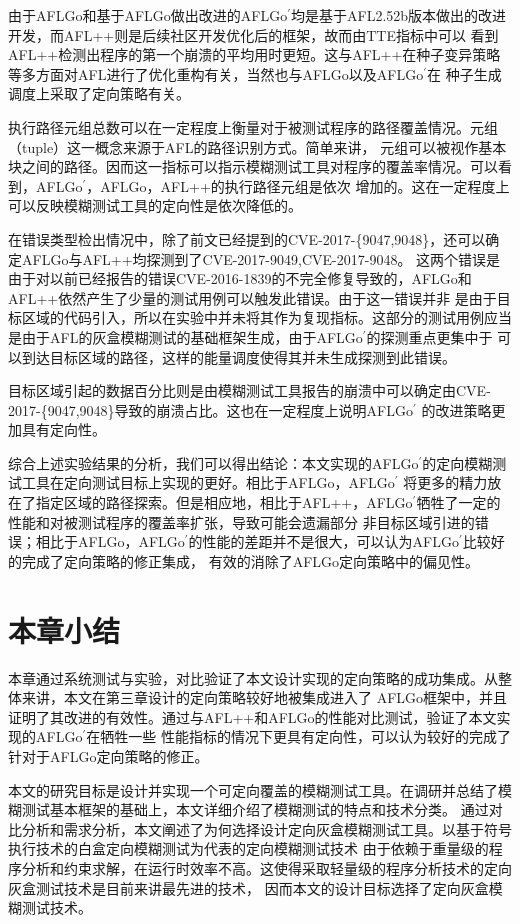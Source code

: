 \documentclass[bachelor]{njupthesis}
\begin{document}
由于AFLGo和基于AFLGo做出改进的AFLGo$^\prime$均是基于AFL2.52b版本做出的改进开发，而AFL++则是后续社区开发优化后的框架，故而由TTE指标中可以
看到AFL++检测出程序的第一个崩溃的平均用时更短。这与AFL++在种子变异策略等多方面对AFL进行了优化重构有关，当然也与AFLGo以及AFLGo$^\prime$在
种子生成调度上采取了定向策略有关。

执行路径元组总数可以在一定程度上衡量对于被测试程序的路径覆盖情况。元组（tuple）这一概念来源于AFL的路径识别方式。简单来讲，
元组可以被视作基本块之间的路径。因而这一指标可以指示模糊测试工具对程序的覆盖率情况。可以看到，AFLGo$^\prime$，AFLGo，AFL++的执行路径元组是依次
增加的。这在一定程度上可以反映模糊测试工具的定向性是依次降低的。

在错误类型检出情况中，除了前文已经提到的CVE-2017-\{9047,9048\}，还可以确定AFLGo与AFL++均探测到了CVE-2017-9049\cite{49CVE},CVE-2017-9048\cite{50CVE}。
这两个错误是由于对以前已经报告的错误CVE-2016-1839\cite{39CVE}的不完全修复导致的，AFLGo和AFL++依然产生了少量的测试用例可以触发此错误。由于这一错误并非
是由于目标区域的代码引入，所以在实验中并未将其作为复现指标。这部分的测试用例应当是由于AFL的灰盒模糊测试的基础框架生成，由于AFLGo$^\prime$的探测重点更集中于
可以到达目标区域的路径，这样的能量调度使得其并未生成探测到此错误。

目标区域引起的数据百分比则是由模糊测试工具报告的崩溃中可以确定由CVE-2017-\{9047,9048\}导致的崩溃占比。这也在一定程度上说明AFLGo$^\prime$
的改进策略更加具有定向性。

综合上述实验结果的分析，我们可以得出结论：本文实现的AFLGo$^\prime$的定向模糊测试工具在定向测试目标上实现的更好。相比于AFLGo，AFLGo$^\prime$
将更多的精力放在了指定区域的路径探索。但是相应地，相比于AFL++，AFLGo$^\prime$牺牲了一定的性能和对被测试程序的覆盖率扩张，导致可能会遗漏部分
非目标区域引进的错误；相比于AFLGo，AFLGo$^\prime$的性能的差距并不是很大，可以认为AFLGo$^\prime$比较好的完成了定向策略的修正集成，
有效的消除了AFLGo定向策略中的偏见性。
\section{本章小结}
本章通过系统测试与实验，对比验证了本文设计实现的定向策略的成功集成。从整体来讲，本文在第三章设计的定向策略较好地被集成进入了
AFLGo框架中，并且证明了其改进的有效性。通过与AFL++和AFLGo的性能对比测试，验证了本文实现的AFLGo$^\prime$在牺牲一些
性能指标的情况下更具有定向性，可以认为较好的完成了针对于AFLGo定向策略的修正。

\thesisconclusion
本文的研究目标是设计并实现一个可定向覆盖的模糊测试工具。在调研并总结了模糊测试基本框架的基础上，本文详细介绍了模糊测试的特点和技术分类。
通过对比分析和需求分析，本文阐述了为何选择设计定向灰盒模糊测试工具。以基于符号执行技术的白盒定向模糊测试为代表的定向模糊测试技术
由于依赖于重量级的程序分析和约束求解，在运行时效率不高。这使得采取轻量级的程序分析技术的定向灰盒测试技术是目前来讲最先进的技术，
因而本文的设计目标选择了定向灰盒模糊测试技术。
\end{document}

